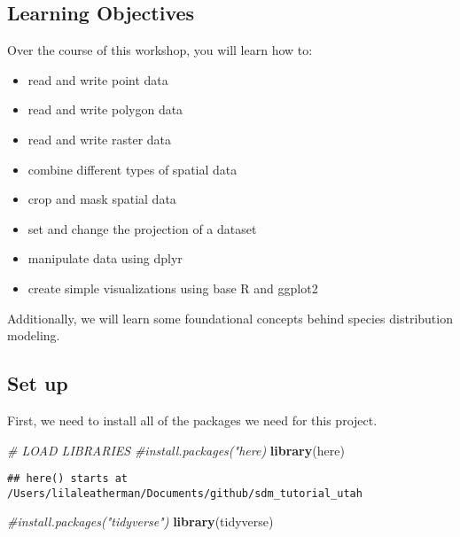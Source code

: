 \documentclass[]{article}
\newenvironment{Shaded}{\begin{snugshade}}{\end{snugshade}}
\newcommand{\KeywordTok}[1]{\textcolor[rgb]{0.13,0.29,0.53}{\textbf{#1}}}
\newcommand{\CommentTok}[1]{\textcolor[rgb]{0.56,0.35,0.01}{\textit{#1}}}
\newcommand{\NormalTok}[1]{#1}
\providecommand{\tightlist}{%
  \setlength{\itemsep}{0pt}\setlength{\parskip}{0pt}}
\begin{document}
\subsection{Learning Objectives}\label{learning-objectives}

Over the course of this workshop, you will learn how to:

\begin{itemize}
\tightlist
\item
  read and write point data
\item
  read and write polygon data
\item
  read and write raster data
\item
  combine different types of spatial data
\item
  crop and mask spatial data
\item
  set and change the projection of a dataset
\item
  manipulate data using dplyr
\item
  create simple visualizations using base R and ggplot2
\end{itemize}

Additionally, we will learn some foundational concepts behind species
distribution modeling.

\subsection{Set up}\label{set-up}

First, we need to install all of the packages we need for this project.

\begin{Shaded}
\begin{Highlighting}[]
\CommentTok{# LOAD LIBRARIES}
  \CommentTok{#install.packages("here)}
    \KeywordTok{library}\NormalTok{(here)}
\end{Highlighting}
\end{Shaded}

\begin{verbatim}
## here() starts at /Users/lilaleatherman/Documents/github/sdm_tutorial_utah
\end{verbatim}

\begin{Shaded}
\begin{Highlighting}[]
  \CommentTok{#install.packages("tidyverse")}
    \KeywordTok{library}\NormalTok{(tidyverse)}
\end{Highlighting}
\end{Shaded}
\end{document}
